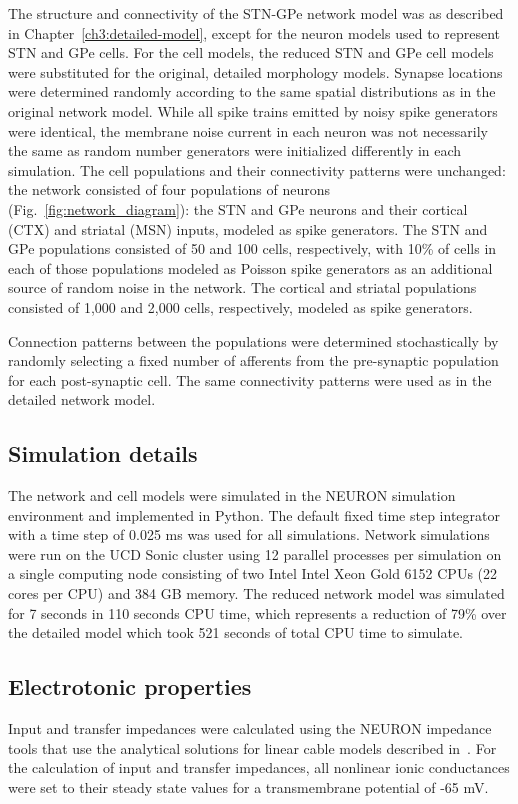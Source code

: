 The structure and connectivity of the STN-GPe network model was as described in
%
Chapter~\ref{ch3:detailed-model}, except for the neuron models used to
represent STN and GPe cells. For the cell models, the reduced STN and GPe
cell models were substituted for the original, detailed morphology models.
Synapse locations were determined randomly according to the same
spatial distributions as in the original network model.
%
%
%
While all spike trains emitted by noisy spike generators
were identical, the membrane noise current in each neuron was not necessarily the same
as random number generators were initialized differently in each simulation.
%
%
The cell populations and their connectivity patterns were unchanged:
the network consisted of four populations of neurons (Fig.~\ref{fig:network_diagram}):
the STN and GPe neurons and their cortical (CTX) and striatal (MSN) inputs, modeled as spike generators.
The STN and GPe populations consisted of 50 and 100 cells, respectively,
with 10\% of cells in each of those populations modeled as Poisson spike generators
as an additional source of random noise in the network. The cortical and
striatal populations consisted of 1,000 and 2,000 cells, respectively,
modeled as spike generators.

%
%
%
%
%
Connection patterns between the populations were determined stochastically by
randomly selecting a fixed number of afferents from the pre-synaptic population
for each post-synaptic cell. The same connectivity patterns were used as in the
detailed network model.


\subsection{Simulation details}

The network and cell models were simulated in the NEURON simulation environment \cite{hines_neuron_1997}
and implemented in Python. The default fixed time step integrator with a
time step of 0.025 ms was used for all simulations.
Network simulations were run on the UCD Sonic cluster using 12 parallel processes per simulation
on a single computing node consisting of two Intel Intel Xeon Gold 6152 CPUs (22 cores per CPU)
and 384 GB memory. The reduced network model was simulated for 7 seconds in 110 seconds CPU time, which
represents a reduction of 79\% over the detailed model which took 521 seconds of total
CPU time to simulate.

\subsection{Electrotonic properties}
%
Input and transfer impedances were calculated using the NEURON impedance
tools that use the analytical solutions for linear cable models described
in~\cite{butz_transient_1974,koch_simple_1985}. For the calculation of input
and transfer impedances, all nonlinear ionic conductances
were set to their steady state values for a transmembrane potential of -65 mV.
%

